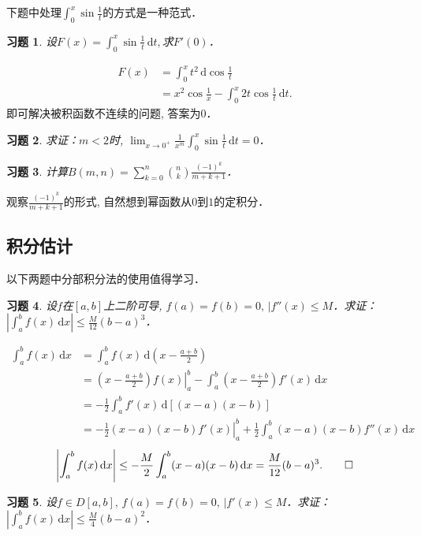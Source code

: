 \documentclass[11pt,a4paper]{ctexart}
\makeatletter
\theoremstyle{thmseries} %
\theoremstyle{exerseries}
\newtheorem{exer}{习题}[section]
\renewenvironment{proof}[1][\proofname]{\par
  \pushQED{\qed}%
  \normalfont \topsep6\p@\@plus6\p@\relax
  \trivlist
  \item[\hskip\labelsep
        \itshape
    #1\@addpunct{}]\ignorespaces
}{%
  \popQED\endtrivlist\@endpefalse
}
\newenvironment{sol}{\begin{proof}[\bfseries\upshape 解\quad]}{\end{proof}}
\newenvironment{pf}{\begin{proof}[\bfseries\upshape 证\quad]}{\end{proof}}
\newcommand{\bra}[1]{\mathopen{}\left(#1\right)}
\renewcommand{\d}{\mathrm{d}}
\makeatother
\begin{document}
下题中处理$\int_{0}^{x}\sin\frac{1}{t}$的方式是一种范式．
\begin{exer}
	设$F(x)=\int_{0}^{x}\sin\frac{1}{t}\,\d t,$求$F'(0)$．
\end{exer}
\begin{sol}
	\begin{align*}
		F(x)&=\int_{0}^{x}t^2\,\d\cos\frac{1}{t}\\
		&=x^2\cos\frac{1}{x}-\int_{0}^{x}2t\cos\frac{1}{t}\,\d t.
	\end{align*}
	即可解决被积函数不连续的问题, 答案为$0$．
\end{sol}

\begin{exer}
	求证：$m<2$时, $\lim_{x\to0^+}\frac{1}{x^m}\int_{0}^{x}\sin\frac{1}{t}\,\d t=0$．
\end{exer}

\begin{exer}
	计算$B(m,n)=\sum_{k=0}^{n}\binom{n}{k}\frac{(-1)^k}{m+k+1}$．
\end{exer}
\begin{sol}
	观察$\frac{(-1)^k}{m+k+1}$的形式, 自然想到幂函数从$0$到$1$的定积分．
\end{sol}


\subsection{积分估计}
以下两题中分部积分法的使用值得学习．
\begin{exer}
	设$f$在$[a,b]$上二阶可导, $f(a)=f(b)=0,\,|f''(x)\leq M$．求证：$\left|\int_{a}^{b}f(x)\,\d x\right|\leq\frac{M}{12}(b-a)^3$．	
\end{exer}
\begin{pf}
	\begin{align*}
		\int_{a}^{b}f(x)\,\d x&=\int_{a}^{b}f(x)\,\d\bra{x-\frac{a+b}{2}}\\
		&=\left.\bra{x-\frac{a+b}{2}}f(x)\right|_a^b-\int_{a}^{b}\bra{x-\frac{a+b}{2}}f'(x)\,\d x\\
		&=-\frac{1}{2}\int_{a}^{b}f'(x)\,\d[(x-a)(x-b)]\\
		&=\left.-\frac{1}{2}(x-a)(x-b)f'(x)\right|_a^b+\frac{1}{2}\int_{a}^{b}(x-a)(x-b)f''(x)\,\d x
	\end{align*}
	\[\left|\int_{a}^{b}f(x)\,\d x\right|\leq-\frac{M}{2}\int_{a}^{b}(x-a)(x-b)\,\d x=\frac{M}{12}(b-a)^3.\qedhere\]
\end{pf}

\begin{exer}
	设$f\in D[a,b],\,f(a)=f(b)=0,\,|f'(x)\leq M$．求证：$\left|\int_{a}^{b}f(x)\,\d x\right|\leq\frac{M}{4}(b-a)^2$．
\end{exer}
\end{document}
